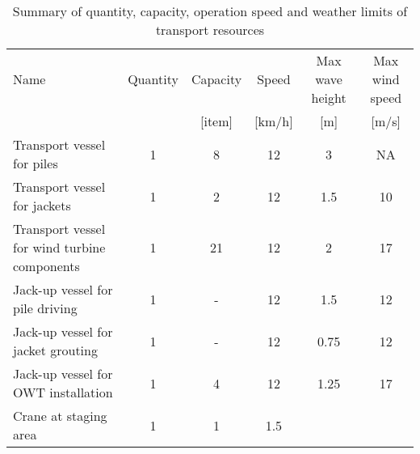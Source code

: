 \begin{table}
\label{tab:input}
\begin{tabular}{lccccc}
\hline 
Name & Quantity & Capacity & Speed & Max wave height & Max wind speed \\
& & [item] & [km/h] & [m] & [m/s] \\ 
\hline 
Transport vessel for piles & 1 & 8 & 12 & 3 & NA \\ 
Transport vessel for jackets & 1 & 2 & 12 & 1.5 & 10 \\ 
Transport vessel for wind turbine components & 1 & 21 & 12 & 2 & 17 \\ 
Jack-up vessel for pile driving & 1 & - & 12 & 1.5 & 12\\
Jack-up vessel for jacket grouting & 1 & - & 12 & 0.75 & 12\\
Jack-up vessel for OWT installation & 1 & 4 & 12 & 1.25 & 17 \\
Crane at staging area & 1 & 1 & 1.5 & & \\
\hline 
\end{tabular}

\caption{Summary of quantity, capacity, operation speed and weather limits of transport resources}
\end{table}
